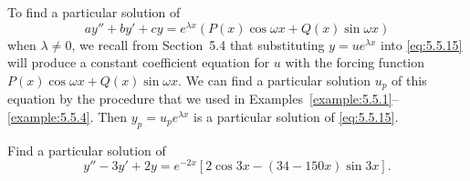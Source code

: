 
\noindent
To find a particular solution of
\begin{equation}
  \label{eq:5.5.15}ay''+by'+cy=e^{\lambda x}\left(P(x)\cos\omega x+Q(x)\sin\omega x\right)
\end{equation}
when $\lambda\ne0$, we recall from Section~5.4 that substituting $y=ue^{\lambda x}$ into
\eqref{eq:5.5.15} will produce a constant coefficient equation for $u$ with the forcing function
$P(x)\cos\omega x+Q(x)\sin\omega x$. We can find a particular solution $u_{p}$ of this equation by
the procedure that we used in Examples~\ref{example:5.5.1}--\ref{example:5.5.4}. Then
$y_{p}=u_{p}e^{\lambda x}$ is a particular solution of \eqref{eq:5.5.15}.

\begin{example}
  \label{example:5.5.5} \rm Find a particular solution of
  \begin{equation}
    \label{eq:5.5.16}y''-3y'+2y=e^{-2x}\left[2\cos3x-(34-150x)\sin3x\right].
  \end{equation}
\end{example}

